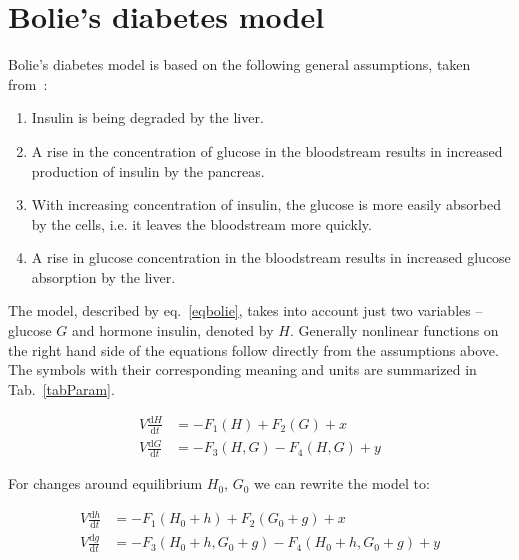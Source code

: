 \documentclass{article}
\providecommand{\m}[1]{\ensuremath{\mathrm{#1}}}
\begin{document}
\section{Bolie's diabetes model}

Bolie's diabetes model is based on the following general assumptions, taken from~\cite{fulford_modelling_1997}:

\begin{enumerate}
	\item
	Insulin is being degraded by the liver.	
	\item
	A rise in the concentration of glucose in the bloodstream results in increased production of insulin by the pancreas.
	\item
	With increasing concentration of insulin, the glucose is more easily absorbed by the cells, i.e. it leaves the bloodstream more quickly.
	\item
	A rise in glucose concentration in the bloodstream results in increased glucose absorption by the liver.

\end{enumerate}


The model, described by eq.~\ref{eqbolie}, takes into account just two variables -- glucose $G$ and hormone insulin, denoted by $H$. Generally nonlinear functions on the right hand side of the equations follow directly from the assumptions above. The symbols with their corresponding meaning and units are summarized in Tab.~\ref{tabParam}. 

\begin{equation}
\label{eqbolie}
\begin{aligned}
V\frac{\m{d} H}{\m{d} t}&=-F_1(H)+F_2(G)+ x\\
V\frac{\m{d} G}{\m{d} t}&=-F_3(H,G)-F_4(H,G) + y 
\end{aligned}
\end{equation}

For changes around equilibrium $H_0$, $G_0$ we can rewrite the model to:

\begin{equation}
\label{eqbolieEquilibrium}
\begin{aligned}
V\frac{\m{d}h}{\m{d}t}&=-F_1(H_0+h)+F_2(G_0+g)+ x\\
V\frac{\m{d}g}{\m{d}t}&=-F_3(H_0+h,G_0+g)-F_4(H_0+h,G_0+g)+ y
\end{aligned}
\end{equation}
\end{document}
